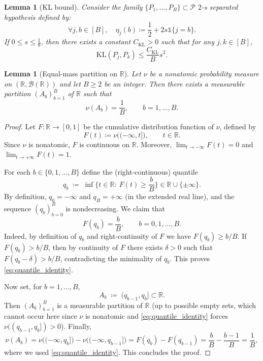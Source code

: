 \documentclass{article}
\theoremstyle{plain}
\newtheorem{lemma}[theorem]{Lemma}
\theoremstyle{definition}
\theoremstyle{remark}
\begin{document}
\begin{lemma}[KL bound]
\label{lem:kl_bound}
Consider the family  $\{P_1, \dots, P_B\} \subset \mathcal{P}$ $2$-s separated hypothesis defined by:
    $$
    \forall j,b \in [B], \quad \eta_j(b) \coloneqq \frac{1}{2} + 2s \mathds{1}\{j =b\}.
    $$ 
    If $0 \leq s \leq \frac{1}{8}$, then there exists a constant $C_\mathrm{KL} >0$ such that for any $j,k \in [B]$,
    $$
    \mathrm{KL}(P_j, P_k) \leq \frac{C_\mathrm{KL}}{B} s^2. 
    $$
\end{lemma}


\begin{lemma}[Equal-mass partition on $\mathbb R$]
\label{lem:equal_mass_partition_R}
Let $\nu$ be a nonatomic probability measure on $(\mathbb R,\mathcal B(\mathbb R))$ and let
$B\ge 2$ be an integer. Then there exists a measurable partition
$(A_b)_{b=1}^B$ of $\mathbb R$ such that
\[
\nu(A_b)=\frac{1}{B},\qquad b=1,\dots,B.
\]
\end{lemma}

\begin{proof}
Let $F:\mathbb R\to[0,1]$ be the cumulative distribution function of $\nu$, defined by
\[
F(t)\coloneqq \nu\big((-\infty,t]\big),\qquad t\in\mathbb R.
\]
Since $\nu$ is nonatomic, $F$ is continuous on $\mathbb R$.
Moreover, $\lim_{t\to-\infty}F(t)=0$ and $\lim_{t\to+\infty}F(t)=1$.

For each $b\in\{0,1,\dots,B\}$ define the (right-continuous) quantile
\[
q_b \;\coloneqq\; \inf\Big\{t\in\mathbb R:\ F(t)\ge \frac{b}{B}\Big\}\in \mathbb R\cup\{\pm\infty\}.
\]
By definition, $q_0=-\infty$ and $q_B=+\infty$ (in the extended real line), and the sequence
$(q_b)_{b=0}^B$ is nondecreasing. We claim that
\begin{equation}
\label{eq:quantile_identity}
F(q_b)=\frac{b}{B},\qquad b=0,1,\dots,B.
\end{equation}
Indeed, by definition of $q_b$ and right-continuity of $F$ we have $F(q_b)\ge b/B$.
If $F(q_b)>b/B$, then by continuity of $F$ there exists $\delta>0$ such that
$F(q_b-\delta)>b/B$, contradicting the minimality of $q_b$.
This proves \eqref{eq:quantile_identity}.

Now set, for $b=1,\dots,B$,
\[
A_b \;\coloneqq\; (q_{b-1},q_b]\subset \mathbb R.
\]
Then $(A_b)_{b=1}^B$ is a measurable partition of $\mathbb R$ (up to possible empty sets, which
cannot occur here since $\nu$ is nonatomic and \eqref{eq:quantile_identity} forces
$\nu((q_{b-1},q_b])>0$). Finally,
\[
\nu(A_b)
=\nu\big((-\infty,q_b]\big)-\nu\big((-\infty,q_{b-1}]\big)
=F(q_b)-F(q_{b-1})
=\frac{b}{B}-\frac{b-1}{B}
=\frac{1}{B},
\]
where we used \eqref{eq:quantile_identity}. This concludes the proof.
\end{proof}
\end{document}
